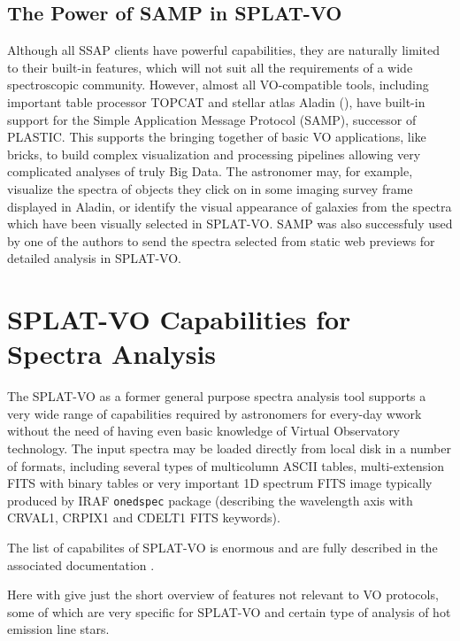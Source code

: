 \documentclass[final,authoryear,5p,times,twocolumn]{elsarticle}
\begin{document}

\subsection{The Power of SAMP in SPLAT-VO}

Although all SSAP clients have powerful capabilities, they are naturally
limited to their built-in features, which will not suit all the requirements
of a wide spectroscopic community. However, almost all VO-compatible tools,
including important table processor TOPCAT and stellar atlas Aladin
(), have built-in support for the Simple Application Message
Protocol (SAMP), successor of PLASTIC. This supports the bringing together of
basic VO applications, like bricks, to build complex visualization and
processing pipelines allowing very complicated analyses of truly Big Data.
The astronomer may, for example, visualize the spectra of objects they click
on in some imaging survey frame displayed in Aladin, or identify the visual
appearance of galaxies from the spectra which have been visually selected in
SPLAT-VO.  SAMP was also successfuly used by one of the authors to send the
spectra selected from static web previews for detailed analysis in SPLAT-VO.


\section{SPLAT-VO Capabilities  for Spectra Analysis}

The SPLAT-VO as a former general purpose spectra analysis tool supports a very
wide range of capabilities required by astronomers for every-day wwork without
the need of having even basic knowledge of Virtual Observatory technology. The
input spectra may be loaded directly from local disk in a number of formats,
including several types of multicolumn ASCII tables, multi-extension FITS with
binary tables or very important 1D spectrum FITS image typically produced by
IRAF {\tt onedspec} package (describing the wavelength axis with CRVAL1, CRPIX1
and CDELT1 FITS keywords).

The list of capabilites of SPLAT-VO is enormous and are fully described in
the associated documentation \citep[SUN/243;][]{sun243}.

Here with give just the short overview of features not relevant to VO
protocols, some of which are very
specific for SPLAT-VO and certain type of analysis of hot emission line stars.
\end{document}
